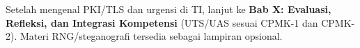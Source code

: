 \documentclass[main.tex]{subfiles}
\begin{document}

\begin{transition}
Setelah mengenal PKI/TLS dan urgensi di TI, lanjut ke \textbf{Bab X: Evaluasi, Refleksi, dan Integrasi Kompetensi} (UTS/UAS sesuai CPMK-1 dan CPMK-2). Materi RNG/steganografi tersedia sebagai lampiran opsional.
\end{transition}

\ifSubfilesClassLoaded{
  \renewcommand{\bibname}{Daftar Pustaka}
  
  
}{}
\end{document}
